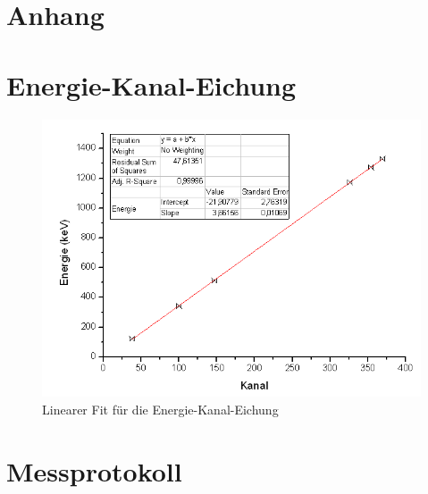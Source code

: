 \section{Anhang}

\begin{appendix}

\section{Energie-Kanal-Eichung}
\begin{figure}[H]
\centering \includegraphics[width = \textwidth]{auswertung/Eichung.png}
\caption{Linearer Fit für die Energie-Kanal-Eichung}
\end{figure}


\clearpage %

\section{Messprotokoll}

\end{appendix}
